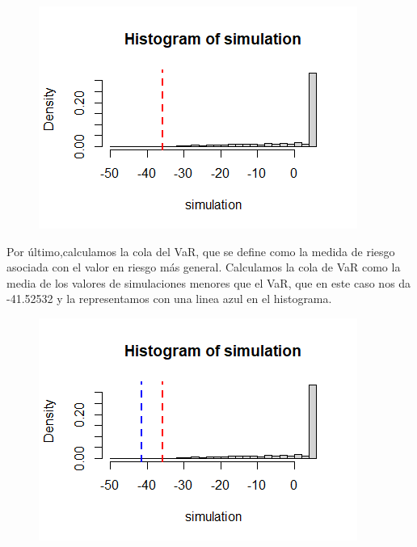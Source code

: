 \documentclass[a4paper]{article}
\begin{document}
\begin{figure}[H]
    \centering
    \includegraphics[width=0.6\linewidth]{Rplot112.png}  
\end{figure}
Por último,calculamos la cola del VaR, que se define como la medida de riesgo asociada con el valor en riesgo más general. Calculamos la cola de VaR como la media de los valores de simulaciones menores que el VaR, que en este caso nos da -41.52532 y la representamos con una linea azul en el histograma.
\begin{figure}[H]
    \centering
    \includegraphics[width=0.6\linewidth]{Rplot113.png}
\end{figure}
\end{document}
